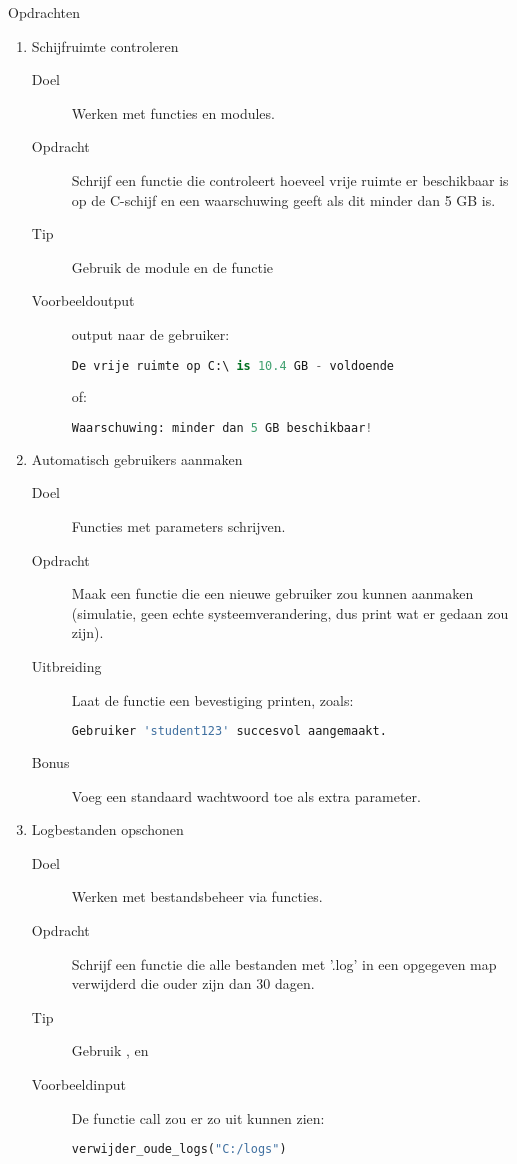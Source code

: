 Opdrachten
\begin{enumerate}
\item Schijfruimte controleren
	\begin{description}
	\item[Doel] Werken met functies en modules.
	\item[Opdracht] Schrijf een functie  die controleert hoeveel vrije ruimte er beschikbaar is op de C-schijf en een waarschuwing geeft als dit minder dan 5 GB is.
	\item[Tip] Gebruik de module  en de functie 
	\item[Voorbeeldoutput] output naar de gebruiker:
\begin{lstlisting}[language=python]
De vrije ruimte op C:\ is 10.4 GB - voldoende
\end{lstlisting}
of:
\begin{lstlisting}[language=python]
Waarschuwing: minder dan 5 GB beschikbaar!
\end{lstlisting}
	\end{description}

\item Automatisch gebruikers aanmaken
	\begin{description}
	\item[Doel] Functies met parameters schrijven.
	\item[Opdracht] Maak een functie  die een nieuwe gebruiker zou kunnen aanmaken (simulatie, geen echte systeemverandering, dus print wat er gedaan zou zijn).
	\item[Uitbreiding] Laat de functie een bevestiging printen, zoals:
\begin{lstlisting}[language=python]
Gebruiker 'student123' succesvol aangemaakt.
\end{lstlisting}
	\item[Bonus] Voeg een standaard wachtwoord toe als extra parameter.
	\end{description}

\item Logbestanden opschonen
	\begin{description}
	\item[Doel] Werken met bestandsbeheer via functies.
	\item[Opdracht] Schrijf een functie  die alle bestanden met '.log' in een opgegeven map verwijderd die ouder zijn dan 30 dagen.
	\item[Tip] Gebruik ,  en 
	\item[Voorbeeldinput] De functie call zou er zo uit kunnen zien:
\begin{lstlisting}[language=python]
verwijder_oude_logs("C:/logs")
\end{lstlisting}
	\end{description}


\end{enumerate}
